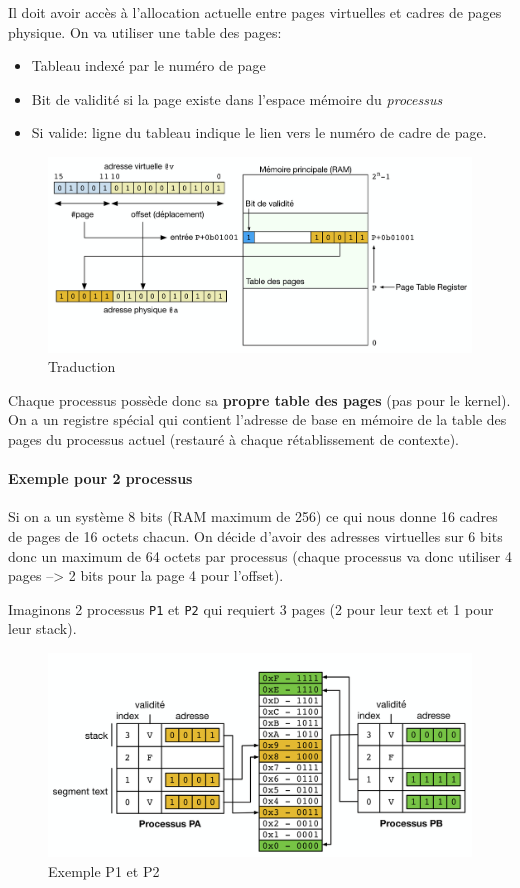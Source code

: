 Il doit avoir accès à l'allocation actuelle entre pages virtuelles et
cadres de pages physique. On va utiliser une table des pages:

\begin{itemize}
\tightlist
\item
  Tableau indexé par le numéro de page
\item
  Bit de validité si la page existe dans l'espace mémoire du
  \emph{processus}
\item
  Si valide: ligne du tableau indique le lien vers le numéro de cadre de
  page.
\end{itemize}

\begin{figure}
\centering
\includegraphics{image-54.png}
\caption{Traduction}
\end{figure}

Chaque processus possède donc sa \textbf{propre table des pages} (pas
pour le kernel). On a un registre spécial qui contient l'adresse de base
en mémoire de la table des pages du processus actuel (restauré à chaque
rétablissement de contexte).

\paragraph{Exemple pour 2 processus}\label{exemple-pour-2-processus}

Si on a un système 8 bits (RAM maximum de 256) ce qui nous donne 16
cadres de pages de 16 octets chacun. On décide d'avoir des adresses
virtuelles sur 6 bits donc un maximum de 64 octets par processus (chaque
processus va donc utiliser 4 pages --\textgreater{} 2 bits pour la page
4 pour l'offset).

Imaginons 2 processus \texttt{P1} et \texttt{P2} qui requiert 3 pages (2
pour leur text et 1 pour leur stack).

\begin{figure}
\centering
\includegraphics{image-55.png}
\caption{Exemple P1 et P2}
\end{figure}

